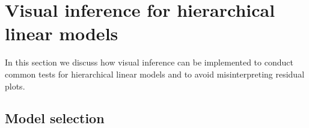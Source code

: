 \documentclass{article} %
\begin{document}
\section{Visual inference for hierarchical linear models}

In this section we discuss how visual inference can be implemented to conduct common tests for hierarchical linear models and to avoid misinterpreting residual plots. 


\subsection{Model selection}





%
\end{document}
